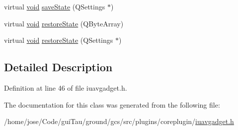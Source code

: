 \begin{DoxyCompactItemize}
\item 
virtual \hyperlink{group___u_a_v_objects_plugin_ga444cf2ff3f0ecbe028adce838d373f5c}{void} \hyperlink{group___core_plugin_ga9759b09853e66682145bff354bbc67a2}{save\-State} (Q\-Settings $\ast$)
\item 
virtual \hyperlink{group___u_a_v_objects_plugin_ga444cf2ff3f0ecbe028adce838d373f5c}{void} \hyperlink{group___core_plugin_ga5dd9e50dd4b774c9629db1253b996b40}{restore\-State} (Q\-Byte\-Array)
\item 
virtual \hyperlink{group___u_a_v_objects_plugin_ga444cf2ff3f0ecbe028adce838d373f5c}{void} \hyperlink{group___core_plugin_ga33f4d9ab2eb15e1a3f70729c67ebc6e2}{restore\-State} (Q\-Settings $\ast$)
\end{DoxyCompactItemize}


\subsection{Detailed Description}


Definition at line 46 of file iuavgadget.\-h.



The documentation for this class was generated from the following file\-:\begin{DoxyCompactItemize}
\item 
/home/jose/\-Code/gui\-Tau/ground/gcs/src/plugins/coreplugin/\hyperlink{iuavgadget_8h}{iuavgadget.\-h}\end{DoxyCompactItemize}
